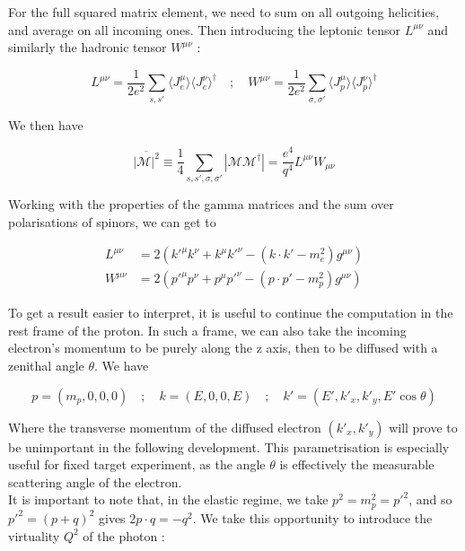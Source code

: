 \documentclass[a4paper,10pt]{report}
\begin{document}
For the full squared matrix element, we need to sum on all outgoing helicities, and average on all incoming ones.
Then introducing the leptonic tensor $L^{\mu \nu}$ and similarly the hadronic tensor $W^{\mu \nu}$ : 

\begin{equation}
  L^{\mu \nu} = \frac{1}{2e^2}\sum_{s, s'} \langle J^{\mu}_e \rangle \langle J^{\nu}_e \rangle^{\dagger} \quad ; 
  \quad W^{\mu \nu} = \frac{1}{2e^2}\sum_{\sigma, \sigma'} \langle J^{\mu}_p \rangle \langle J^{\nu}_p \rangle^{\dagger}
  \label{eq:tensors}
\end{equation}

We then have 

\begin{equation}
  \overline{|\mathcal{M}|^2} \equiv \frac{1}{4}\sum_{s, s', \sigma, \sigma'} |\mathcal{M}\mathcal{M}^{\dagger}| = \frac{e^4}{q^4} L^{\mu \nu} W_{\mu \nu}
  \label{eq:dirac_me1}
\end{equation}

Working with the properties of the gamma matrices and the sum over polarisations of spinors, we can get to 

\begin{align}
  L^{\mu \nu} &= 2(k'^{\mu}k^{\nu} + k^{\mu}k'^{\nu} - (k\cdot k' - m_e^2)g^{\mu \nu}) \label{eq:ps_leptensor}\\ 
  W^{\mu \nu} &= 2(p'^{\mu}p^{\nu} + p^{\mu}p'^{\nu} - (p\cdot p' - m_p^2)g^{\mu \nu})
  \label{eq:ps_hadrtensor}
\end{align}

To get a result easier to interpret, it is useful to continue the computation in the rest frame of the proton. 
In such a frame, we can also take the incoming electron's momentum to be purely along the z axis, then to be diffused 
with a zenithal angle $\theta$. We have

\begin{equation}
  p = (m_p, 0, 0, 0) \quad;\quad
  k = (E, 0, 0, E) \quad;\quad k' = (E', k'_x, k'_y, E'\cos\theta)
\end{equation}

Where the transverse momentum of the diffused electron $(k'_x, k'_y)$ will prove to be unimportant 
in the following development. This parametrisation is especially useful for fixed target experiment, as 
the angle $\theta$ is effectively the measurable scattering angle of the electron.\\

It is important to note that, in the elastic regime, we take $p^2 = m_p^2 = p'^2$, and so 
$p'^2 = (p+q)^2$ gives $2p\cdot q = -q^2$. We take this opportunity to introduce the virtuality $Q^2$ of the 
photon : 
\end{document}
